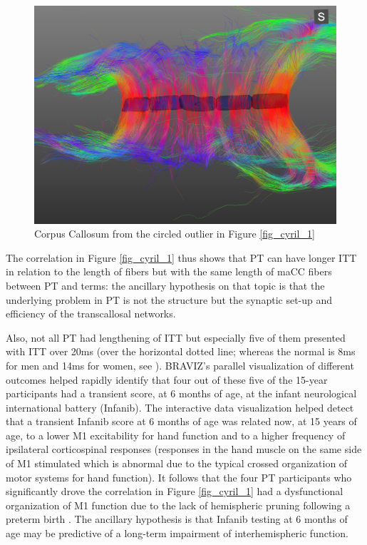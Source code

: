\documentclass[twocolumn]{svjour3}
\begin{document}
\begin{figure}
	\centering
		\includegraphics[width=\linewidth]{cc_cyril}
	\caption{Corpus Callosum from the circled outlier in Figure \ref{fig_cyril_1}}
	\label{fig_cyril_2}
\end{figure}

The correlation in Figure \ref{fig_cyril_1} thus shows that PT can have longer ITT in relation to the length of fibers but with the same length of maCC fibers between PT and terms: the ancillary hypothesis on that topic is that the underlying problem in PT is not the structure but the synaptic set-up and efficiency of the transcallosal networks.

Also, not all PT had lengthening of ITT but especially five of them presented with ITT over 20ms (over the horizontal dotted line; whereas the normal is 8ms for men and 14ms for women, see \cite{schneider_cerebral_2012}). BRAVIZ’s parallel visualization of different outcomes helped rapidly identify that four out of these five of the 15-year participants had a transient score, at 6 months of age, at the infant neurological international battery (Infanib). 
The interactive data visualization helped detect that a transient Infanib score at 6 months of age was related now, at 15 years of age, to a lower M1 excitability for hand function and to a higher frequency of ipsilateral corticospinal responses (responses in the hand muscle on the same side of M1 stimulated which is abnormal due to the typical crossed organization of motor systems for hand function). It follows that the four PT participants who significantly drove the correlation in Figure \ref{fig_cyril_1} had a dysfunctional organization of M1 function due to the lack of hemispheric pruning following a preterm birth \cite{schneider_cerebral_2012}. The ancillary hypothesis is that Infanib testing at 6 months of age may be predictive of a long-term impairment of interhemispheric function.
\end{document}
